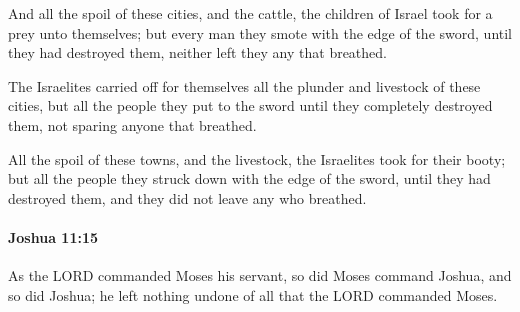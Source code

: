 			\begin{versebox}
					\item[BHS] 
					\item[ASV] And all the spoil of these cities, and the cattle, the children of Israel took for a prey unto themselves; but every man they smote with the edge of the sword, until they had destroyed them, neither left they any that breathed.
					\item[NIV] The Israelites carried off for themselves all the plunder and livestock of these cities, but all the people they put to the sword until they completely destroyed them, not sparing anyone that breathed.
					\item[NRSV] All the spoil of these towns, and the livestock, the Israelites took for their booty; but all the people they struck down with the edge of the sword, until they had destroyed them, and they did not leave any who breathed.
			\end{versebox}

		\paragraph{Joshua 11:15} %
			\label{JOSHUA-11-15}

			As the LORD commanded Moses his servant, so did Moses command Joshua, and so did Joshua; he left nothing undone of all that the LORD commanded Moses.

